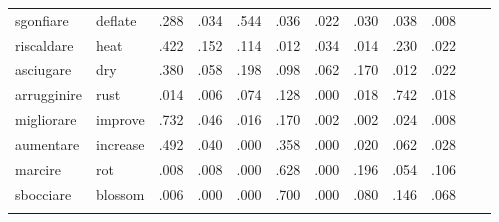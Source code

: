 \documentclass[output=paper,colorlinks,citecolor=brown
]{langscibook}
\begin{document}
\begin{table}
{\begin{tabular}{llrrrrrrrrrr}
sgonfiare    & deflate  & .288     & .034   & .544                       & .036                                   & .022                                     & .030                  & .038                 & .008  \\
riscaldare   & heat     & .422     & .152  & .114                       & .012                                   & .034                                     & .014                  & .230                & .022  \\
asciugare    & dry      & .380     & .058   & .198                       & .098                                   & .062                                     & .170                 & .012                 & .022  \\
arrugginire  & rust     & .014      & .006   & .074                        & .128                                  & .000                                     & .018                  & .742                & .018  \\
migliorare   & improve  & .732     & .046   & .016                        & .170                                  & .002                                     & .002                  & .024                 & .008  \\
aumentare    & increase & .492     & .040   & .000                        & .358                                  & .000                                     & .020                  & .062                 & .028  \\
marcire      & rot      & .008      & .008   & .000                        & .628                                  & .000                                     & .196                 & .054                 & .106 \\
sbocciare    & blossom  & .006      & .000   & .000                        & .700                                  & .000                                     & .080                  & .146                & .068  \\
\lspbottomrule
\end{tabular}
}
\end{table}
 
 
\printbibliography[heading=subbibliography,notkeyword=this]
\end{document}
